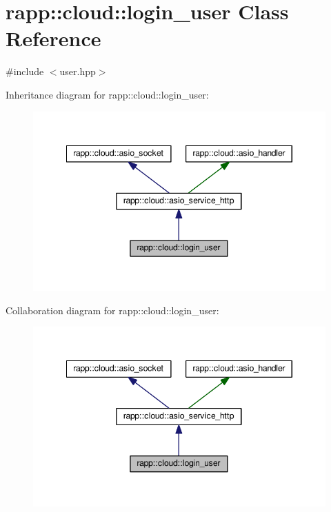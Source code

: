 \hypertarget{classrapp_1_1cloud_1_1login__user}{\section{rapp\-:\-:cloud\-:\-:login\-\_\-user Class Reference}
\label{classrapp_1_1cloud_1_1login__user}
}


{\ttfamily \#include $<$user.\-hpp$>$}



Inheritance diagram for rapp\-:\-:cloud\-:\-:login\-\_\-user\-:
\nopagebreak
\begin{figure}[H]
\begin{center}
\leavevmode
\includegraphics[width=345pt]{classrapp_1_1cloud_1_1login__user__inherit__graph}
\end{center}
\end{figure}


Collaboration diagram for rapp\-:\-:cloud\-:\-:login\-\_\-user\-:
\nopagebreak
\begin{figure}[H]
\begin{center}
\leavevmode
\includegraphics[width=345pt]{classrapp_1_1cloud_1_1login__user__coll__graph}
\end{center}
\end{figure}
